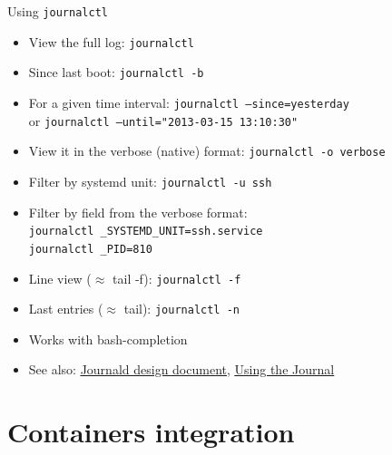 \documentclass[11pt,final,usepdftitle=false]{beamer}
\begin{document}
\begin{frame}{Using \texttt{journalctl}}
	\begin{itemize}
		\item View the full log: \texttt{journalctl}
			\hbr
		\item Since last boot: \texttt{journalctl -b}
			\hbr
	\item For a given time interval: \texttt{journalctl --since=yesterday}\\
		or \texttt{journalctl --until="2013-03-15 13:10:30"}
			\hbr
		\item View it in the verbose (native) format: \texttt{journalctl -o verbose}
			\hbr
		\item Filter by systemd unit: \texttt{journalctl -u ssh}
			\hbr
		\item Filter by field from the verbose format:\\
			\texttt{journalctl \_SYSTEMD\_UNIT=ssh.service}\\
			\texttt{journalctl \_PID=810}
			\hbr
		\item Line view ($\approx$ tail -f): \texttt{journalctl -f}
			\hbr
		\item Last entries ($\approx$ tail): \texttt{journalctl -n}
		\hbr
		\item Works with bash-completion
			\hbr
		\item See also: \href{https://docs.google.com/document/pub?id=1IC9yOXj7j6cdLLxWEBAGRL6wl97tFxgjLUEHIX3MSTs}{\ul{Journald design document}}, \href{http://0pointer.net/blog/projects/journalctl.html}{\ul{Using the Journal}}

	\end{itemize}
\end{frame}

\section{Containers integration}
\end{document}
